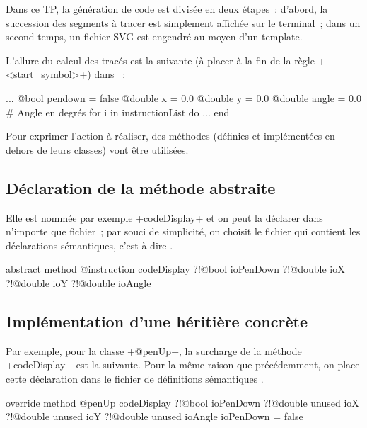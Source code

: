 
Dans ce TP, la génération de code est divisée en deux étapes~: d'abord, la succession des segments à tracer est simplement affichée sur le terminal~; dans un second temps, un fichier SVG est engendré au moyen d'un template.

L'allure du calcul des tracés est la suivante (à placer à la fin de la règle \ggsq+<start_symbol>+) dans ~:

\begin{galgas4}
  ...
  @bool pendown = false
  @double x = 0.0
  @double y = 0.0
  @double angle = 0.0 # Angle en degrés
  for i in instructionList do
    ...
  end
\end{galgas4}

Pour exprimer l'action à réaliser, des méthodes (définies et implémentées en dehors de leurs classes) vont être utilisées.

\subsection{Déclaration de la méthode abstraite}
Elle est nommée par exemple \ggsq+codeDisplay+ et on peut la déclarer dans n'importe que fichier~; par souci de simplicité, on choisit le fichier qui contient les déclarations sémantiques, c'est-à-dire .

\begin{galgas4}
abstract method @instruction codeDisplay
  ?!@bool ioPenDown
  ?!@double ioX
  ?!@double ioY
  ?!@double ioAngle
\end{galgas4}

\subsection{Implémentation d'une héritière concrète}

Par exemple, pour la classe \ggsq+@penUp+, la surcharge de la méthode \ggsq+codeDisplay+ est la suivante. Pour la même raison que précédemment, on place cette déclaration dans le fichier de définitions sémantiques .

\begin{galgas4}
override method @penUp codeDisplay
  ?!@bool ioPenDown
  ?!@double unused ioX
  ?!@double unused ioY
  ?!@double unused ioAngle
{
  ioPenDown = false
}
\end{galgas4}

